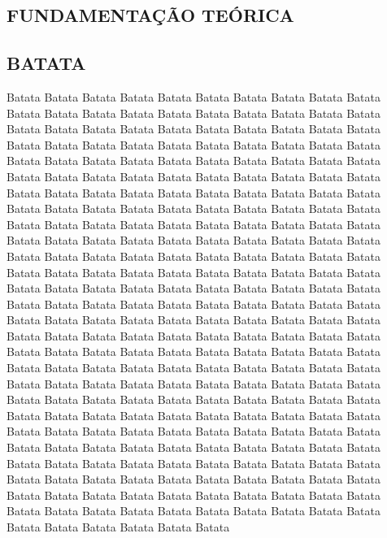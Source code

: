 \begin{flushright}

    \justify

    \titleformat{\section}{\large\bfseries}{\thesection}{1em}{}
    \titleformat{\subsection}{\normalfont\large}{\thesubsection}{1em}{}

    \section{FUNDAMENTAÇÃO TEÓRICA}
    \vspace{0.5cm}
    \subsection{BATATA}
    \vspace{0.5cm}   

    Batata Batata Batata Batata Batata Batata Batata Batata Batata Batata Batata Batata 
    Batata Batata Batata Batata Batata Batata Batata Batata Batata Batata Batata Batata 
    Batata Batata Batata Batata Batata Batata Batata Batata Batata Batata Batata Batata 
    Batata Batata Batata Batata Batata Batata Batata Batata Batata Batata Batata Batata 
    Batata Batata Batata Batata Batata Batata Batata Batata Batata Batata Batata Batata 
    Batata Batata Batata Batata Batata Batata Batata Batata Batata Batata Batata Batata 
    Batata Batata Batata Batata Batata Batata Batata Batata Batata Batata Batata Batata 
    Batata Batata Batata Batata Batata Batata Batata Batata Batata Batata Batata Batata 
    Batata Batata Batata Batata Batata Batata Batata Batata Batata Batata Batata Batata 
    Batata Batata Batata Batata Batata Batata Batata Batata Batata Batata Batata Batata 
    Batata Batata Batata Batata Batata Batata Batata Batata Batata Batata Batata Batata 
    Batata Batata Batata Batata Batata Batata Batata Batata Batata Batata Batata Batata 
    Batata Batata Batata Batata Batata Batata Batata Batata Batata Batata Batata Batata 
    Batata Batata Batata Batata Batata Batata Batata Batata Batata Batata Batata Batata 
    Batata Batata Batata Batata Batata Batata Batata Batata Batata Batata Batata Batata 
    Batata Batata Batata Batata Batata Batata Batata Batata Batata Batata Batata Batata 
    Batata Batata Batata Batata Batata Batata Batata Batata Batata Batata Batata Batata 
    Batata Batata Batata Batata Batata Batata Batata Batata Batata Batata Batata Batata 
    Batata Batata Batata Batata Batata Batata Batata Batata Batata Batata Batata Batata 
    Batata Batata Batata Batata Batata Batata Batata Batata Batata Batata Batata Batata 
    Batata Batata Batata Batata Batata Batata Batata Batata Batata Batata Batata Batata 
    Batata Batata Batata Batata Batata Batata Batata Batata Batata Batata Batata Batata 
    Batata Batata Batata Batata Batata Batata Batata Batata Batata Batata Batata Batata 
    

\end{flushright}
